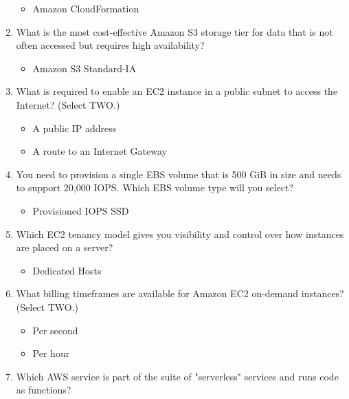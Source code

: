 \begin{enumerate}
	\begin{itemize}
	\item Amazon CloudFormation
\end{itemize}

	\item What is the most cost-effective Amazon S3 storage tier for data that is not often accessed but requires high availability?

	\begin{itemize}
	\item Amazon S3 Standard-IA
\end{itemize}

	\item What is required to enable an EC2 instance in a public subnet to access the Internet? (Select TWO.)

	\begin{itemize}
	\item A public IP address
	\item A route to an Internet Gateway
\end{itemize}

	\item You need to provision a single EBS volume that is 500 GiB in size and needs to support 20,000 IOPS. Which EBS volume type will you select?

	\begin{itemize}
	\item Provisioned IOPS SSD
\end{itemize}

	\item Which EC2 tenancy model gives you visibility and control over how instances are placed on a server?

	\begin{itemize}
	\item Dedicated Hosts
\end{itemize}

	\item What billing timeframes are available for Amazon EC2 on-demand instances? (Select TWO.)

	\begin{itemize}
	\item Per second
	\item Per hour
\end{itemize}

	\item Which AWS service is part of the suite of "serverless" services and runs code as functions?


\end{enumerate}
